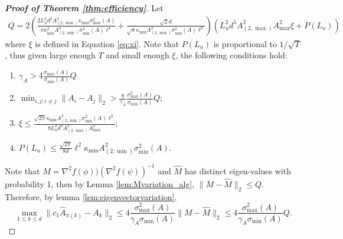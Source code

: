 \begin{proof}[{\bf Proof of Theorem  \ref{thm:efficiency}}]
Let 
 \begin{align*}
Q = 2\left( \frac{2L_u^2d^2A_{(2,\max)}^2\kappa_{\max}\sigma_{\max}^2(A)}{\pi\kappa^2_{\min}A^4_{(2,\min)}\sigma_{\min}^4(A)\ell^4} + 
\frac{\sqrt{2}d}{\sqrt{\pi}\kappa_{\min}A^2_{(2,\min)}\sigma_{\min}^2(A)\ell^2}
\right)\left(L_u^2d^5 A_{(2,\max)}^2A_{\max}^2\xi + P(L_u)\right)
 \end{align*}
 where $\xi$ is defined in Equation \eqref{eq:xi}.
 Note that $P(L_u)$ is proportional to $1/\sqrt{T}$, thus given large enough $T$ and small enough $\xi$, the following conditions hold:
 \begin{enumerate}
 \vspace{-3mm}
 \item $\gamma_A > 4\frac{\sigma_{\max}(A)}{\sigma_{\min}(A)} Q$
 \item $\min_{i,j:i\neq j} \|A_i - A_j\|_2 > \frac{8}{\gamma_A}\frac{\sigma_{\max}^2(A)}{\sigma_{\min}(A) } Q$;
 \item $\xi \le \frac{\sqrt{2\pi}\kappa_{\min}A^2_{(2,\min)}\sigma_{\min}^2(A)\ell^2}{8L_u^2d^6 A_{(2,\max)}^2A_{\max}^2}$;
 \item  $P(L_u) \le \frac{\sqrt{2\pi}}{8d}\ell^2\kappa_{\min}A^2_{(2,\min)}\sigma_{\min}^2(A)$. 
  \end{enumerate}

Note that $M = \nabla^2f(\phi))(\nabla^2f(\psi))^{-1}$ and $\hat{M}$ has distinct eigen-values with probability 1,  then by Lemma \ref{lem:Mvariation_alg}, $\|M-\hat{M}\|_2 \le Q$.
Therefore, by lemma \ref{lem:eigenvectorvariation}, 
  \[
  \max_{1\le k\le d}\| c_1\hat{A}_{\pi(k)} - A_k\|_2 \le 4 \frac{\sigma_{\max}^2(A)}{\gamma_A \sigma_{\min}(A)}\|M - \hat{M} \|_2 \le 4 \frac{\sigma_{\max}^2(A)}{\gamma_A \sigma_{\min}(A)} Q. 
  \]
 
\end{proof}

